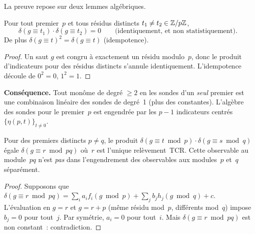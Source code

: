 \documentclass[12pt,a4paper]{article}
\begin{document}
La preuve repose sur deux lemmes algébriques. \mTHM

\begin{lemme}
\label{lem:indicator_sat}
Pour tout premier~$p$ et tous résidus distincts
$t_1 \ne t_2 \in \mathbb{Z}/p\mathbb{Z}$,
\[
  \delta(g \equiv t_1) \cdot \delta(g \equiv t_2) = 0
  \qquad\text{(identiquement, et non statistiquement).}
\]
De plus $\delta(g \equiv t)^2 = \delta(g \equiv t)$ (idempotence).
\end{lemme}

\begin{proof}
Un saut $g$ est congru à exactement un résidu modulo~$p$, donc le
produit d'indicateurs pour des résidus distincts s'annule
identiquement. L'idempotence découle de $0^2 = 0$, $1^2 = 1$.
\end{proof}

\noindent
\textbf{Conséquence.} Tout monôme de degré $\ge 2$ en les sondes
d'un \emph{seul} premier est une combinaison linéaire des sondes de
degré~1 (plus des constantes). L'algèbre des sondes pour le
premier~$p$ est engendrée par les $p{-}1$ indicateurs centrés
$\{\eta(p, t)\}_{t \ne 0}$.

\begin{lemme}
\label{lem:CRT_irred}
Pour des premiers distincts $p \ne q$, le produit
$\delta(g \equiv t \bmod p) \cdot \delta(g \equiv s \bmod q)$ égale
$\delta(g \equiv r \bmod pq)$ où~$r$ est l'unique relèvement~TCR.
Cette observable au module~$pq$ n'est \emph{pas} dans
l'engendrement des observables aux modules~$p$ et~$q$ séparément.
\end{lemme}

\begin{proof}
Supposons que
$\delta(g \equiv r \bmod pq) = \sum_i a_i f_i(g \bmod p) + \sum_j b_j
h_j(g \bmod q) + c$.
L'évaluation en $g = r$ et $g = r + p$ (même résidu mod~$p$,
différents mod~$q$) impose $b_j = 0$ pour tout~$j$. Par symétrie,
$a_i = 0$ pour tout~$i$. Mais $\delta(g \equiv r \bmod pq)$ est non
constant~: contradiction.
\end{proof}
\end{document}
